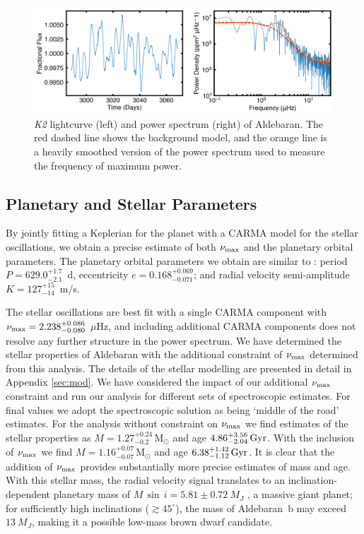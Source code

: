 \documentclass[modern]{aastex61}
\newcommand{\numax}{\mbox{$\nu_{\rm max}$}\xspace}
\newcommand{\muHz}{\mbox{$\mu$Hz}\xspace}
\newcommand{\ktwo}{\emph{K2}\xspace}
\begin{document}
\begin{figure}
\centering
\includegraphics[width=\textwidth]{k2obs.png}
\caption{\ktwo lightcurve (left) and power spectrum (right) of Aldebaran. The red dashed line shows the background model, and the orange line is a heavily smoothed version of the power spectrum used to measure the frequency of maximum power. }
\label{k2_lightcurve}
\end{figure}

\subsection{Planetary and Stellar Parameters}

By jointly fitting a Keplerian for the planet with a CARMA model for the stellar oscillations, we obtain a precise estimate of both \numax and the planetary orbital parameters. The planetary orbital parameters we obtain are similar to \citet{Hatzes2015}: period $P = 629.0^{+ 1.7}_{-2.1}$~d, eccentricity $e = 0.168^{+ 0.069}_{- 0.071}$; and radial velocity semi-amplitude $K = 127^{+ 15}_{- 14}$~m/s.

The stellar oscillations are best fit with a single CARMA component with $\numax = 2.238^{+ 0.086}_{- 0.080}$ \muHz, and including additional CARMA components does not resolve any further structure in the power spectrum. We have determined the stellar properties of Aldebaran with the additional constraint of \numax determined from this analysis.  The details of the stellar modelling are presented in detail in Appendix \ref{sec:mod}.  We have considered the impact of our additional \numax constraint and run our analysis for different sets of spectroscopic estimates.  For final values we adopt the \citet{2012Sheffield} spectroscopic solution as being `middle of the road' estimates.  For the analysis without constraint on \numax we find estimates of the stellar properties as $M = 1.27^{+0.24}_{-0.2} \, \mathrm{M_{\odot}}$ and age $4.86^{+3.56}_{-2.04} \, \rm Gyr$.  With the inclusion of \numax we find $M = 1.16^{+0.07}_{-0.07} \, \mathrm{M_{\odot}}$ and age $6.38^{+1.42}_{-1.12} \, \rm Gyr$.  It is clear that the addition of \numax provides substantially more precise estimates of mass and age. With this stellar mass, the radial velocity signal translates to an inclination-dependent planetary mass of $M\,\sin\,{i} = 5.81 \pm 0.72~M_J$ \citep[Equation~1]{Torres2008}, a massive giant planet; for sufficiently high inclinations ($\gtrsim 45^\circ$), the mass of Aldebaran~b may exceed $13~M_J$, making it a possible low-mass brown dwarf candidate.  %
\end{document}
